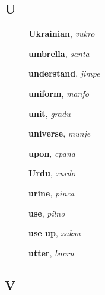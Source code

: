 \documentclass[12pt]{book}
\begin{document}
\subsection{U} %

\begin{description}

\item[ ] \textbf{Ukrainian}, \textit{vukro}

\item[ ] \textbf{umbrella}, \textit{santa}

\item[ ] \textbf{understand}, \textit{jimpe}

\item[ ] \textbf{uniform}, \textit{manfo}

\item[ ] \textbf{unit}, \textit{gradu}

\item[ ] \textbf{universe}, \textit{munje}

\item[ ] \textbf{upon}, \textit{cpana}

\item[ ] \textbf{Urdu}, \textit{xurdo}

\item[ ] \textbf{urine}, \textit{pinca}

\item[ ] \textbf{use}, \textit{pilno}

\item[ ] \textbf{use up}, \textit{xaksu}

\item[ ] \textbf{utter}, \textit{bacru}



\end{description}



\subsection{V} %
\end{document}
